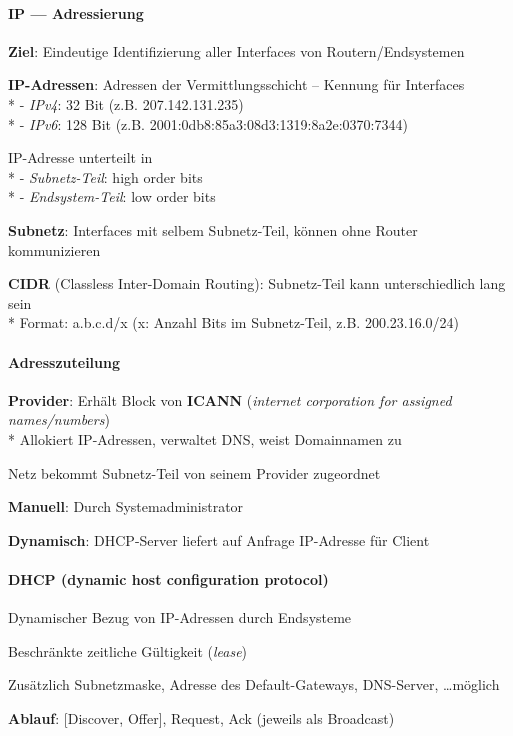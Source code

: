 \paragraph{IP --- Adressierung}
\begin{items}
  \item \textbf{Ziel}: Eindeutige Identifizierung aller Interfaces von Routern/Endsystemen
  \item \textbf{IP-Adressen}: Adressen der Vermittlungsschicht -- Kennung für Interfaces \\*
    - \emph{IPv4}: 32 Bit (z.B. 207.142.131.235) \\*
    - \emph{IPv6}: 128 Bit (z.B. 2001:0db8:85a3:08d3:1319:8a2e:0370:7344)
    
    \medskip
  \item IP-Adresse unterteilt in \\*
    - \emph{Subnetz-Teil}: high order bits \\*
    - \emph{Endsystem-Teil}: low order bits
  \item \textbf{Subnetz}: Interfaces mit selbem Subnetz-Teil, können ohne Router kommunizieren
  \item \textbf{CIDR} (Classless Inter-Domain Routing): Subnetz-Teil kann unterschiedlich lang sein\\*
  	Format: a.b.c.d/x (x: Anzahl Bits im Subnetz-Teil, z.B. 200.23.16.0/24)
\end{items}

\paragraph{Adresszuteilung}
\begin{items}
	\item \textbf{Provider}: Erhält Block von \textbf{ICANN} (\emph{internet corporation for assigned names/numbers}) \\*
	Allokiert IP-Adressen, verwaltet DNS, weist Domainnamen zu
	\item Netz bekommt Subnetz-Teil von seinem Provider zugeordnet
  \item \textbf{Manuell}: Durch Systemadministrator
  \item \textbf{Dynamisch}: DHCP-Server liefert auf Anfrage IP-Adresse für Client
\end{items}

\paragraph{DHCP (dynamic host configuration protocol)}
\begin{items}
	\item Dynamischer Bezug von IP-Adressen durch Endsysteme
	\item Beschränkte zeitliche Gültigkeit (\emph{lease})
	\item Zusätzlich Subnetzmaske, Adresse des Default-Gateways, DNS-Server, \dots möglich
	\item \textbf{Ablauf}: [Discover, Offer], Request, Ack (jeweils als Broadcast)
\end{items}

